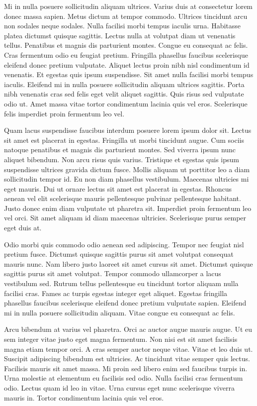 \documentclass[12pt,ngerman,a4paper,oneside,,tablecaptionabove]{scrbook}
\begin{document}
Mi in nulla posuere sollicitudin aliquam ultrices. Varius duis at
consectetur lorem donec massa sapien. Metus dictum at tempor commodo.
Ultrices tincidunt arcu non sodales neque sodales. Nulla facilisi morbi
tempus iaculis urna. Habitasse platea dictumst quisque sagittis. Lectus
nulla at volutpat diam ut venenatis tellus. Penatibus et magnis dis
parturient montes. Congue eu consequat ac felis. Cras fermentum odio eu
feugiat pretium. Fringilla phasellus faucibus scelerisque eleifend donec
pretium vulputate. Aliquet lectus proin nibh nisl condimentum id
venenatis. Et egestas quis ipsum suspendisse. Sit amet nulla facilisi
morbi tempus iaculis. Eleifend mi in nulla posuere sollicitudin aliquam
ultrices sagittis. Porta nibh venenatis cras sed felis eget velit
aliquet sagittis. Quis risus sed vulputate odio ut. Amet massa vitae
tortor condimentum lacinia quis vel eros. Scelerisque felis imperdiet
proin fermentum leo vel.

Quam lacus suspendisse faucibus interdum posuere lorem ipsum dolor sit.
Lectus sit amet est placerat in egestas. Fringilla ut morbi tincidunt
augue. Cum sociis natoque penatibus et magnis dis parturient montes. Sed
viverra ipsum nunc aliquet bibendum. Non arcu risus quis varius.
Tristique et egestas quis ipsum suspendisse ultrices gravida dictum
fusce. Mollis aliquam ut porttitor leo a diam sollicitudin tempor id. Eu
non diam phasellus vestibulum. Maecenas ultricies mi eget mauris. Dui ut
ornare lectus sit amet est placerat in egestas. Rhoncus aenean vel elit
scelerisque mauris pellentesque pulvinar pellentesque habitant. Justo
donec enim diam vulputate ut pharetra sit. Imperdiet proin fermentum leo
vel orci. Sit amet aliquam id diam maecenas ultricies. Scelerisque purus
semper eget duis at.

Odio morbi quis commodo odio aenean sed adipiscing. Tempor nec feugiat
nisl pretium fusce. Dictumst quisque sagittis purus sit amet volutpat
consequat mauris nunc. Nam libero justo laoreet sit amet cursus sit
amet. Dictumst quisque sagittis purus sit amet volutpat. Tempor commodo
ullamcorper a lacus vestibulum sed. Rutrum tellus pellentesque eu
tincidunt tortor aliquam nulla facilisi cras. Fames ac turpis egestas
integer eget aliquet. Egestas fringilla phasellus faucibus scelerisque
eleifend donec pretium vulputate sapien. Eleifend mi in nulla posuere
sollicitudin aliquam. Vitae congue eu consequat ac felis.

Arcu bibendum at varius vel pharetra. Orci ac auctor augue mauris augue.
Ut eu sem integer vitae justo eget magna fermentum. Non nisi est sit
amet facilisis magna etiam tempor orci. A cras semper auctor neque
vitae. Vitae et leo duis ut. Suscipit adipiscing bibendum est ultricies.
Ac tincidunt vitae semper quis lectus. Facilisis mauris sit amet massa.
Mi proin sed libero enim sed faucibus turpis in. Urna molestie at
elementum eu facilisis sed odio. Nulla facilisi cras fermentum odio.
Lectus quam id leo in vitae. Urna cursus eget nunc scelerisque viverra
mauris in. Tortor condimentum lacinia quis vel eros.
\end{document}
